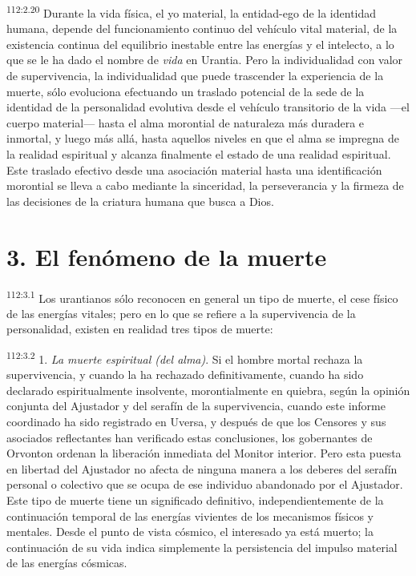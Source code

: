 \par
\textsuperscript{112:2.20} Durante la vida física, el yo material, la entidad-ego de la identidad humana, depende del funcionamiento continuo del vehículo vital material, de la existencia continua del equilibrio inestable entre las energías y el intelecto, a lo que se le ha dado el nombre de \textit{vida} en Urantia. Pero la individualidad con valor de supervivencia, la individualidad que puede trascender la experiencia de la muerte, sólo evoluciona efectuando un traslado potencial de la sede de la identidad de la personalidad evolutiva desde el vehículo transitorio de la vida ---el cuerpo material--- hasta el alma morontial de naturaleza más duradera e inmortal, y luego más allá, hasta aquellos niveles en que el alma se impregna de la realidad espiritual y alcanza finalmente el estado de una realidad espiritual. Este traslado efectivo desde una asociación material hasta una identificación morontial se lleva a cabo mediante la sinceridad, la perseverancia y la firmeza de las decisiones de la criatura humana que busca a Dios.

\section*{3. El fenómeno de la muerte}
\par
\textsuperscript{112:3.1} Los urantianos sólo reconocen en general un tipo de muerte, el cese físico de las energías vitales; pero en lo que se refiere a la supervivencia de la personalidad, existen en realidad tres tipos de muerte:

\par
\textsuperscript{112:3.2} 1. \textit{La muerte espiritual (del alma)}. Si el hombre mortal rechaza la supervivencia, y cuando la ha rechazado definitivamente, cuando ha sido declarado espiritualmente insolvente, morontialmente en quiebra, según la opinión conjunta del Ajustador y del serafín de la supervivencia, cuando este informe coordinado ha sido registrado en Uversa, y después de que los Censores y sus asociados reflectantes han verificado estas conclusiones, los gobernantes de Orvonton ordenan la liberación inmediata del Monitor interior. Pero esta puesta en libertad del Ajustador no afecta de ninguna manera a los deberes del serafín personal o colectivo que se ocupa de ese individuo abandonado por el Ajustador. Este tipo de muerte tiene un significado definitivo, independientemente de la continuación temporal de las energías vivientes de los mecanismos físicos y mentales. Desde el punto de vista cósmico, el interesado ya está muerto; la continuación de su vida indica simplemente la persistencia del impulso material de las energías cósmicas.

